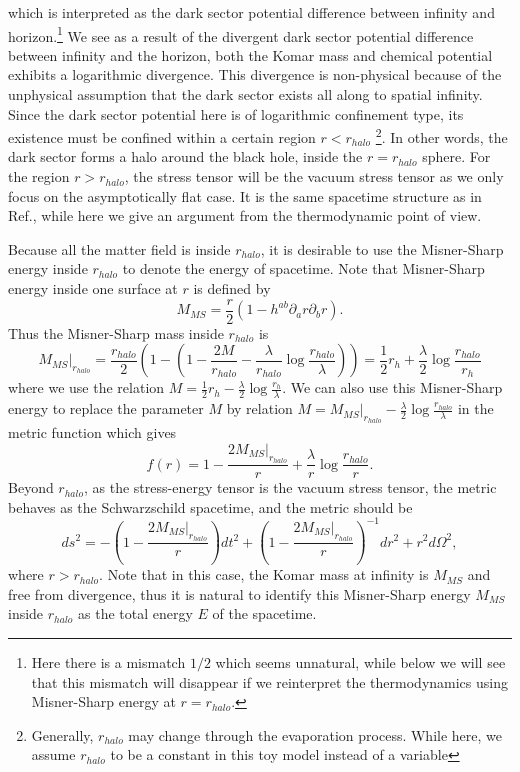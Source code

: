 \documentclass[a4paper,11pt]{article}
\begin{document}
which is interpreted as the dark sector potential difference between infinity and horizon.\footnote{Here there is a mismatch $1/2$ which seems unnatural, while below we will see that this mismatch will disappear if we reinterpret the thermodynamics using Misner-Sharp energy at $r=r_{halo}$.} We see as a result of the divergent dark sector potential difference between infinity and the horizon, both the Komar mass and chemical potential exhibits a logarithmic divergence.  This divergence is non-physical because of the unphysical assumption that the dark sector exists all along to spatial infinity. Since the dark sector potential here is of logarithmic confinement type, its existence must be confined within a certain region $r<r_{halo}$ \footnote{Generally, $r_{halo}$ may change through the evaporation process. While here, we assume $r_{halo}$ to be a constant in this toy model instead of a variable}. In other words, the dark sector forms a halo around the black hole, inside the $r=r_{halo}$ sphere. For the region $r>r_{halo}$, the stress tensor will be the vacuum stress tensor as we only focus on the asymptotically flat case. It is the same spacetime structure as in Ref.\cite{Li:2012zx}, while here we give an argument from the thermodynamic point of view.

Because all the matter field is inside $r_{halo}$, it is desirable to use the Misner-Sharp energy inside $r_{halo}$ to denote the energy of spacetime. 
Note that Misner-Sharp energy inside one surface at $r$ is defined by \cite{Misner:1964je,Abdusattar:2021wfv,Hu:2015xva,Zhang:2014goa}
\begin{equation}
M_{MS}=\frac{r}{2}(1-h^{ab}\partial_{a} r\partial_{b} r).
\end{equation}
Thus the Misner-Sharp mass inside $r_{halo}$ is 
\begin{equation}\label{misner}
    M_{MS}|_{r_{halo}}=\frac{r_{halo}}{2}(1-(1-\frac{2M}{r_{halo}}-\frac{\lambda}{r_{halo}} \log \frac{r_{halo}}{\lambda}))=\frac{1}{2}r_{h}+\frac{\lambda}{2}\log \frac{r_{halo}}{r_{h}}
\end{equation}
where we use the relation $M=\frac{1}{2}r_{h}-\frac{\lambda}{2}\log \frac{r_{h}}{\lambda}$. 
We can also use this Misner-Sharp energy to replace the parameter $M$ by relation $M=M_{MS}|_{r_{halo}}-\frac{\lambda}{2}\log\frac{r_{halo}}{\lambda}$ in the metric function which gives
\begin{equation}\label{metric}
f(r)=1-\frac{2M_{MS}|_{r_{halo}}}{r}+\frac{\lambda}{r} \log \frac{r_{halo}}{r}.
\end{equation}
Beyond $r_{halo}$, as the stress-energy tensor is the vacuum stress tensor, the metric behaves as the Schwarzschild spacetime, and the metric should be 
\begin{equation}
ds^{2}=-(1-\frac{2M_{MS}|_{r_{halo}}}{r})dt^{2}+(1-\frac{2M_{MS}|_{r_{halo}}}{r})^{-1} dr^{2}+r^{2}d\Omega^{2},
\end{equation}
where $r>r_{halo}$. Note that in this case, the Komar mass at infinity is $M_{MS}$ and free from divergence, thus it is natural to identify this Misner-Sharp energy $M_{MS}$ inside $r_{halo}$ as the total energy $E$ of the spacetime. 
\end{document}
